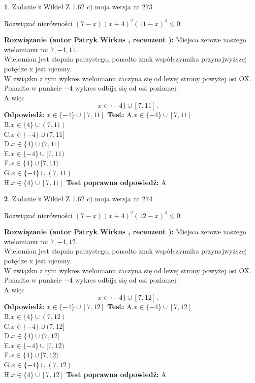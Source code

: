 \documentclass[12pt, a4paper]{article}
\theoremstyle{definition} %
\newtheorem{zad}{}
\newcommand{\zadStart}[1]{\begin{zad}#1\newline}
\newcommand{\zadStop}{\end{zad}}
\newcommand{\rozwStart}[2]{\noindent \textbf{Rozwiązanie (autor #1 , recenzent #2): }\newline}
\newcommand{\rozwStop}{\newline}
\newcommand{\odpStart}{\noindent \textbf{Odpowiedź:}\newline}
\newcommand{\odpStop}{\newline}
\newcommand{\testStart}{\noindent \textbf{Test:}\newline}
\newcommand{\testStop}{\newline}
\newcommand{\kluczStart}{\noindent \textbf{Test poprawna odpowiedź:}\newline}
\newcommand{\kluczStop}{\newline}
\begin{document}
\zadStart{Zadanie z Wikieł Z 1.62 c) moja wersja nr 273}

Rozwiązać nierówności $(7-x)(x+4)^{2}(11-x)^{3}\le0$.
\zadStop
\rozwStart{Patryk Wirkus}{}
Miejsca zerowe naszego wielomianu to: $7, -4, 11$.\\
Wielomian jest stopnia parzystego, ponadto znak współczynnika przy\linebreak najwyższej potędze x jest ujemny.\\ W związku z tym wykres wielomianu zaczyna się od lewej strony powyżej osi OX.\\
Ponadto w punkcie $-4$ wykres odbija się od osi poziomej.\\
A więc $$x \in \{-4\} \cup [7,11].$$
\rozwStop
\odpStart
$x \in \{-4\} \cup [7,11]$
\odpStop
\testStart
A.$x \in \{-4\} \cup [7,11]$\\
B.$x \in \{4\} \cup (7,11)$\\
C.$x \in \{-4\} \cup (7,11]$\\
D.$x \in \{4\} \cup (7,11]$\\
E.$x \in \{-4\} \cup [7,11)$\\
F.$x \in \{4\} \cup [7,11)$\\
G.$x \in \{-4\} \cup (7,11)$\\
H.$x \in \{4\} \cup [7,11]$
\testStop
\kluczStart
A
\kluczStop



\zadStart{Zadanie z Wikieł Z 1.62 c) moja wersja nr 274}

Rozwiązać nierówności $(7-x)(x+4)^{2}(12-x)^{3}\le0$.
\zadStop
\rozwStart{Patryk Wirkus}{}
Miejsca zerowe naszego wielomianu to: $7, -4, 12$.\\
Wielomian jest stopnia parzystego, ponadto znak współczynnika przy\linebreak najwyższej potędze x jest ujemny.\\ W związku z tym wykres wielomianu zaczyna się od lewej strony powyżej osi OX.\\
Ponadto w punkcie $-4$ wykres odbija się od osi poziomej.\\
A więc $$x \in \{-4\} \cup [7,12].$$
\rozwStop
\odpStart
$x \in \{-4\} \cup [7,12]$
\odpStop
\testStart
A.$x \in \{-4\} \cup [7,12]$\\
B.$x \in \{4\} \cup (7,12)$\\
C.$x \in \{-4\} \cup (7,12]$\\
D.$x \in \{4\} \cup (7,12]$\\
E.$x \in \{-4\} \cup [7,12)$\\
F.$x \in \{4\} \cup [7,12)$\\
G.$x \in \{-4\} \cup (7,12)$\\
H.$x \in \{4\} \cup [7,12]$
\testStop
\kluczStart
A
\kluczStop
\end{document}
